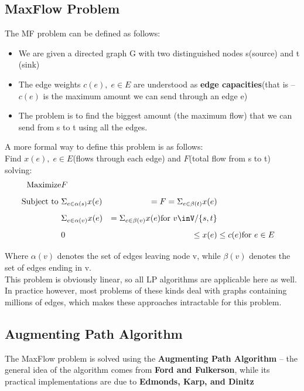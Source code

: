 \subsection{MaxFlow Problem}
{
    The MF problem can be defined as follows:
    \begin{itemize}
        \item We are given a directed graph G with two distinguished nodes s(source) and t (sink)
        \item The edge weights $c(e),\;e\in E$ are understood as \textbf{edge capacities}(that is -- $c(e)$ is the maximum amount we can send through an edge e)
        \item The problem is to find the biggest amount (the maximum flow) that we can send from s to t using all the edges.
    \end{itemize}
    A more formal way to define this problem is as follows:\\
    Find $x(e),\; e \in E$(flows through each edge) and  $F$(total flow from s to t) solving:
\begin{equation}
        \begin{aligned}
            \text{Maximize}&F&\mbox{}\\[1.25ex]
            \text{Subject to }& \Sigma_{e\in\alpha(s)}x(e)&=F = \Sigma_{e\in\beta(t)}x(e)\mbox{}\\[1.25ex]
                              & \Sigma_{e\in\alpha(v)}x(e)&= \Sigma_{e\in\beta(v)}x(e)\mbox{for $v\inV / \{s,t\} $}\\[1.25ex]
                              &0&\le x(e)&\le c(e)\mbox{for $e\in E$}\\[1.25ex]
        \end{aligned}
    \end{equation}
    Where $\alpha(v)$ denotes the set of edges leaving node v, while  $\beta(v)$ denotes the set of edges ending in v.
\\
This problem is obviously linear, so all LP algorithms are applicable here as well. In practice however, most problems of these kinds deal with graphs containing millions of edges, which makes these approaches intractable for this problem.
}

\subsection{Augmenting Path Algorithm}

The MaxFlow problem is solved using the \textbf{Augmenting Path Algorithm} -- the general idea of the algorithm comes from \textbf{Ford and Fulkerson}, while its practical implementations are due to  \textbf{Edmonds, Karp, and Dinitz}



